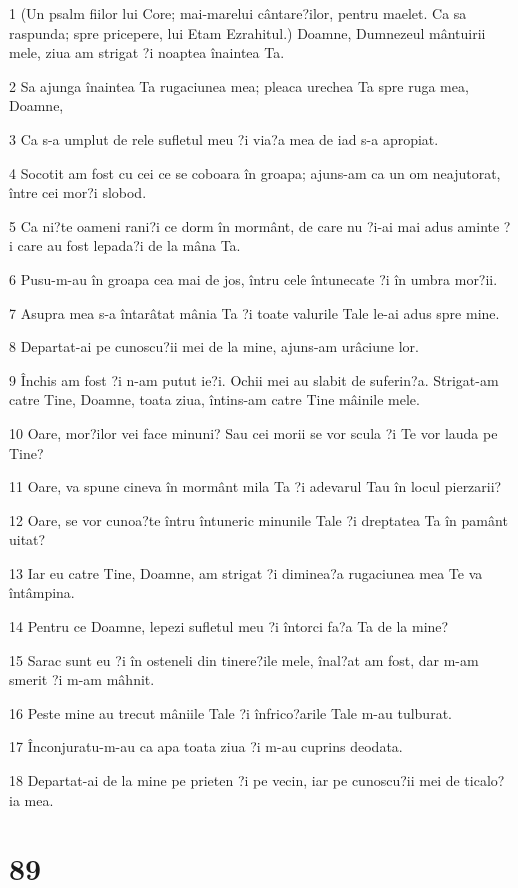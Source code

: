 \par 1 (Un psalm fiilor lui Core; mai-marelui cântare?ilor, pentru maelet. Ca sa raspunda; spre pricepere, lui Etam Ezrahitul.) Doamne, Dumnezeul mântuirii mele, ziua am strigat ?i noaptea înaintea Ta.
\par 2 Sa ajunga înaintea Ta rugaciunea mea; pleaca urechea Ta spre ruga mea, Doamne,
\par 3 Ca s-a umplut de rele sufletul meu ?i via?a mea de iad s-a apropiat.
\par 4 Socotit am fost cu cei ce se coboara în groapa; ajuns-am ca un om neajutorat, între cei mor?i slobod.
\par 5 Ca ni?te oameni rani?i ce dorm în mormânt, de care nu ?i-ai mai adus aminte ?i care au fost lepada?i de la mâna Ta.
\par 6 Pusu-m-au în groapa cea mai de jos, întru cele întunecate ?i în umbra mor?ii.
\par 7 Asupra mea s-a întarâtat mânia Ta ?i toate valurile Tale le-ai adus spre mine.
\par 8 Departat-ai pe cunoscu?ii mei de la mine, ajuns-am urâciune lor.
\par 9 Închis am fost ?i n-am putut ie?i. Ochii mei au slabit de suferin?a. Strigat-am catre Tine, Doamne, toata ziua, întins-am catre Tine mâinile mele.
\par 10 Oare, mor?ilor vei face minuni? Sau cei morii se vor scula ?i Te vor lauda pe Tine?
\par 11 Oare, va spune cineva în mormânt mila Ta ?i adevarul Tau în locul pierzarii?
\par 12 Oare, se vor cunoa?te întru întuneric minunile Tale ?i dreptatea Ta în pamânt uitat?
\par 13 Iar eu catre Tine, Doamne, am strigat ?i diminea?a rugaciunea mea Te va întâmpina.
\par 14 Pentru ce Doamne, lepezi sufletul meu ?i întorci fa?a Ta de la mine?
\par 15 Sarac sunt eu ?i în osteneli din tinere?ile mele, înal?at am fost, dar m-am smerit ?i m-am mâhnit.
\par 16 Peste mine au trecut mâniile Tale ?i înfrico?arile Tale m-au tulburat.
\par 17 Înconjuratu-m-au ca apa toata ziua ?i m-au cuprins deodata.
\par 18 Departat-ai de la mine pe prieten ?i pe vecin, iar pe cunoscu?ii mei de ticalo?ia mea.

\chapter{89}

